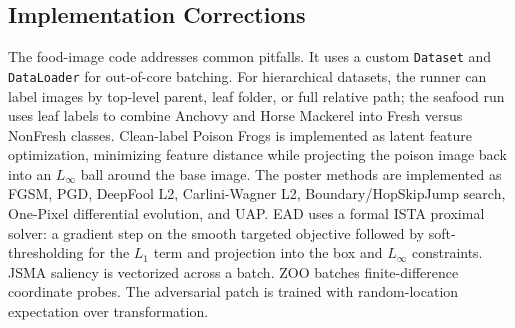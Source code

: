 ﻿\documentclass[6p,10pt,times]{ieeeaccess}
\begin{document}
\subsection{Implementation Corrections}

The food-image code addresses common pitfalls. It uses a custom \texttt{Dataset} and \texttt{DataLoader} for out-of-core batching. For hierarchical datasets, the runner can label images by top-level parent, leaf folder, or full relative path; the seafood run uses leaf labels to combine Anchovy and Horse Mackerel into Fresh versus NonFresh classes. Clean-label Poison Frogs is implemented as latent feature optimization, minimizing feature distance while projecting the poison image back into an \(L_\infty\) ball around the base image. The poster methods are implemented as FGSM, PGD, DeepFool L2, Carlini-Wagner L2, Boundary/HopSkipJump search, One-Pixel differential evolution, and UAP. EAD uses a formal ISTA proximal solver: a gradient step on the smooth targeted objective followed by soft-thresholding for the \(L_1\) term and projection into the box and \(L_\infty\) constraints. JSMA saliency is vectorized across a batch. ZOO batches finite-difference coordinate probes. The adversarial patch is trained with random-location expectation over transformation.
\end{document}
